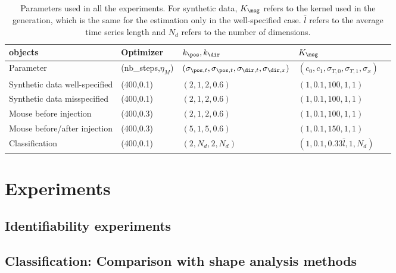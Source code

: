  \begin{table}[hbt!]
  \caption{Parameters used in all the experiments.
   For synthetic data, $K_\msg$ refers to the kernel used in the generation, which is the same for the estimation only in the well-specified case. $\bar{l}$ refers to the average time series length and $N_d$ refers to the number of dimensions.}
  \centering
  \begin{tabular}{lllll}

            \toprule 
            objects & Optimizer &$k_\pos,k_\dir$ & $K_\msg $ \\
            \midrule
            Parameter & (nb\_steps,$\eta_M$) &$(\sigma_{\pos,t}, \sigma_{\pos,t}, \sigma_{\dir,t}, \sigma_{\dir,x})$ & $(c_0,c_1,\sigma_{T,0},\sigma_{T,1},\sigma_x)$ \\
            \midrule
            Synthetic data well-specified &(400,0.1) &$(2,1,2,0.6)$& $(1,0.1,100,1,1)$   \\
            Synthetic data misspecified  & (400,0.1)  & $ (2,1,2,0.6)$ &$(1,0.1,100,1,1)$  \\
            Mouse before injection  & (400,0.3)  & $ (2,1,2,0.6)$ &$(1,0.1,100,1,1)$  \\
            Mouse before/after injection  & (400,0.3)  & $ (5,1,5,0.6)$ &$(1,0.1,150,1,1)$  \\
            Classification  & (400,0.1)  & $(2,N_d,2,N_d)$  & $(1,0.1,0.33\bar{l},1,N_d)$  \\

            \bottomrule
          \end{tabular}
        \label{appendix:table:set_up_exp_practical}
    \end{table}



\section{Experiments}

\subsection{Identifiability experiments}
\label{appendix:identifiability}




\subsection{Classification: Comparison with shape analysis methods}
\label{appendix:classification_shape_analysis}

